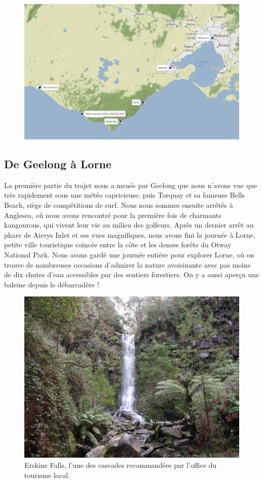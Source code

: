 \begin{figure}
\centering
\includegraphics{maps/great_ocean_road.png}
\end{figure}

\hypertarget{de-geelong-uxe0-lorne}{%
\subsection{De Geelong à Lorne}\label{de-geelong-uxe0-lorne}}

La première partie du trajet nous a menés par Geelong que nous n'avons
vue que très rapidement sous une météo capricieuse, puis Torquay et sa
fameuse Bells Beach, siège de compétitions de surf. Nous nous sommes
ensuite arrêtés à Anglesea, où nous avons rencontré pour la première
fois de charmants kangourous, qui vivent leur vie au milieu des
golfeurs. Après un dernier arrêt au phare de Aireys Inlet et ses vues
magnifiques, nous avons fini la journée à Lorne, petite ville
touristique coincée entre la côte et les denses forêts du Otway National
Park. Nous avons gardé une journée entière pour explorer Lorne, où on
trouve de nombreuses occasions d'admirer la nature avoisinante avec pas
moins de dix chutes d'eau accessibles par des sentiers forestiers. On y
a aussi aperçu une baleine depuis le débarcadère !

\begin{figure}
\centering
\includegraphics{images/20180731_erskinefalls.JPG}
\caption{Erskine Falls, l'une des cascades recommandées par l'office du
tourisme local.}
\end{figure}

